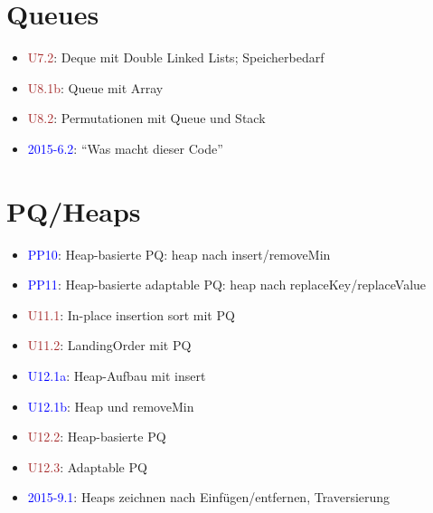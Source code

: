 \documentclass[a4paper]{article}
\newcommand{\ub}[1]{\textcolor{blue}{#1}}
\newcommand{\ubc}[1]{\textcolor{brown}{#1}}
\begin{document}
\section{Queues}
\begin{itemize}
  \item \ubc{U7.2}: Deque mit Double Linked Lists; Speicherbedarf
  \item \ubc{U8.1b}: Queue mit Array
  \item \ubc{U8.2}: Permutationen mit Queue und Stack
  \item \ub{2015-6.2}: ``Was macht dieser Code''
\end{itemize}

\section{PQ/Heaps}
\begin{itemize}
  \item \ub{PP10}: Heap-basierte PQ: heap nach insert/removeMin
  \item \ub{PP11}: Heap-basierte adaptable PQ: heap nach replaceKey/replaceValue
  \item \ubc{U11.1}: In-place insertion sort mit PQ
  \item \ubc{U11.2}: LandingOrder mit PQ
  \item \ub{U12.1a}: Heap-Aufbau mit insert
  \item \ub{U12.1b}: Heap und removeMin
  \item \ubc{U12.2}: Heap-basierte PQ
  \item \ubc{U12.3}: Adaptable PQ
  \item \ub{2015-9.1}: Heaps zeichnen nach Einfügen/entfernen, Traversierung
\end{itemize}
\end{document}
